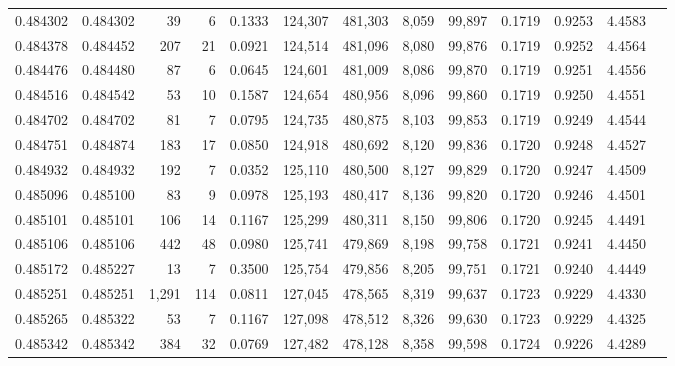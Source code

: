 \begin{tabular}{rrrrrrrrrrrrr}
0.484302 & 0.484302 &    39 &     6 &                                     0.1333 & 124,307 & 481,303 &   8,059 &  99,897 & 0.1719 & 0.9253 & 4.4583 \\
0.484378 & 0.484452 &   207 &    21 &                                     0.0921 & 124,514 & 481,096 &   8,080 &  99,876 & 0.1719 & 0.9252 & 4.4564 \\
0.484476 & 0.484480 &    87 &     6 &                                     0.0645 & 124,601 & 481,009 &   8,086 &  99,870 & 0.1719 & 0.9251 & 4.4556 \\
0.484516 & 0.484542 &    53 &    10 &                                     0.1587 & 124,654 & 480,956 &   8,096 &  99,860 & 0.1719 & 0.9250 & 4.4551 \\
0.484702 & 0.484702 &    81 &     7 &                                     0.0795 & 124,735 & 480,875 &   8,103 &  99,853 & 0.1719 & 0.9249 & 4.4544 \\
0.484751 & 0.484874 &   183 &    17 &                                     0.0850 & 124,918 & 480,692 &   8,120 &  99,836 & 0.1720 & 0.9248 & 4.4527 \\
0.484932 & 0.484932 &   192 &     7 &                                     0.0352 & 125,110 & 480,500 &   8,127 &  99,829 & 0.1720 & 0.9247 & 4.4509 \\
0.485096 & 0.485100 &    83 &     9 &                                     0.0978 & 125,193 & 480,417 &   8,136 &  99,820 & 0.1720 & 0.9246 & 4.4501 \\
0.485101 & 0.485101 &   106 &    14 &                                     0.1167 & 125,299 & 480,311 &   8,150 &  99,806 & 0.1720 & 0.9245 & 4.4491 \\
0.485106 & 0.485106 &   442 &    48 &                                     0.0980 & 125,741 & 479,869 &   8,198 &  99,758 & 0.1721 & 0.9241 & 4.4450 \\
0.485172 & 0.485227 &    13 &     7 &                                     0.3500 & 125,754 & 479,856 &   8,205 &  99,751 & 0.1721 & 0.9240 & 4.4449 \\
0.485251 & 0.485251 & 1,291 &   114 &                                     0.0811 & 127,045 & 478,565 &   8,319 &  99,637 & 0.1723 & 0.9229 & 4.4330 \\
0.485265 & 0.485322 &    53 &     7 &                                     0.1167 & 127,098 & 478,512 &   8,326 &  99,630 & 0.1723 & 0.9229 & 4.4325 \\
0.485342 & 0.485342 &   384 &    32 &                                     0.0769 & 127,482 & 478,128 &   8,358 &  99,598 & 0.1724 & 0.9226 & 4.4289 \\

\end{tabular}
